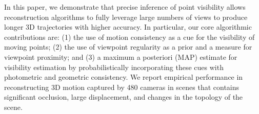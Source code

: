\documentclass[10pt,twocolumn,letterpaper]{article}
\begin{document}

In this paper, we demonstrate that precise inference of point visibility allows reconstruction algorithms to fully leverage large numbers of views to produce longer 3D trajectories with higher accuracy. In particular, our core algorithmic contributions are: (1) the use of motion consistency as a cue for the visibility of moving points; (2) the use of viewpoint regularity as a prior and a measure for viewpoint proximity; and (3) a maximum a posteriori (MAP) estimate for visibility estimation by probabilistically incorporating these cues with photometric and geometric consistency. We report empirical performance in reconstructing 3D motion captured by 480 cameras in scenes that contains significant occlusion, large displacement, and changes in the topology of the scene.



\end{document}
